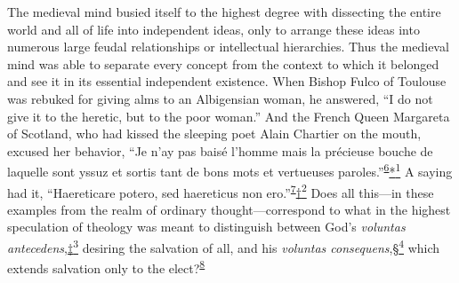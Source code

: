 The medieval mind busied itself to the highest degree with dissecting
the entire world and all of life into independent ideas, only to arrange
these ideas into numerous large feudal relationships or intellectual
hierarchies. Thus the medieval mind was able to separate every concept
from the context to which it belonged and see it in its essential
independent existence. When Bishop Fulco of Toulouse was rebuked for
giving alms to an Albigensian woman, he answered, ``I do not give it to
the heretic, but to the poor woman.'' And the French Queen Margareta of
Scotland, who had kissed the sleeping poet Alain Chartier on the mouth,
excused her behavior, ``Je n'ay pas baisé l'homme mais la précieuse
bouche de laquelle sont yssuz et sortis tant de bons mots et vertueuses
paroles.''\textsuperscript{\protect\hypertarget{17_Chapter_Ten__THE_FAILURE_OF_IMAG.xhtmlux5cux23id_724}{\protect\hyperlink{23_NOTES.xhtmlux5cux23id_725}{6}}}\protect\hypertarget{17_Chapter_Ten__THE_FAILURE_OF_IMAG.xhtmlux5cux23id_2583}{\protect\hyperlink{23_NOTES.xhtmlux5cux23id_2584}{*\textsuperscript{1}}}
A saying had it, ``Haereticare potero, sed haereticus non
ero.''\textsuperscript{\protect\hypertarget{17_Chapter_Ten__THE_FAILURE_OF_IMAG.xhtmlux5cux23id_722}{\protect\hyperlink{23_NOTES.xhtmlux5cux23id_723}{7}}}\protect\hypertarget{17_Chapter_Ten__THE_FAILURE_OF_IMAG.xhtmlux5cux23id_2585}{\protect\hyperlink{23_NOTES.xhtmlux5cux23id_2586}{†\textsuperscript{2}}}
Does all this---in these examples from the realm of ordinary
thought---correspond to what in the highest speculation of theology was
meant to distinguish between God's \emph{voluntas
antecedens},\protect\hypertarget{17_Chapter_Ten__THE_FAILURE_OF_IMAG.xhtmlux5cux23id_2587}{\protect\hyperlink{23_NOTES.xhtmlux5cux23id_2588}{‡\textsuperscript{3}}}
desiring the salvation of all, and his \emph{voluntas
consequens},\protect\hypertarget{17_Chapter_Ten__THE_FAILURE_OF_IMAG.xhtmlux5cux23id_2589}{\protect\hyperlink{23_NOTES.xhtmlux5cux23id_2590}{§\textsuperscript{4}}}
which extends salvation only to the
elect?\textsuperscript{\protect\hypertarget{17_Chapter_Ten__THE_FAILURE_OF_IMAG.xhtmlux5cux23id_720}{\protect\hyperlink{23_NOTES.xhtmlux5cux23id_721}{8}}}

